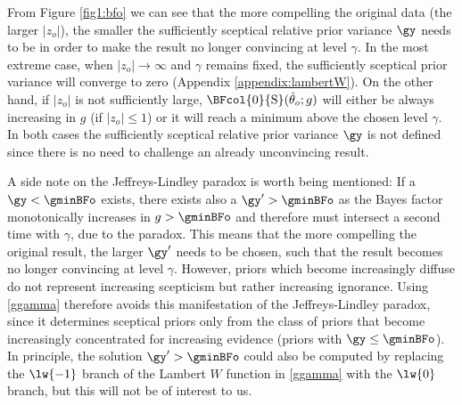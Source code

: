 From Figure \ref{fig1:bfo} we can see that the more compelling the original data
(\ie the larger $|z_o|$), the smaller the sufficiently sceptical relative prior
variance $\gy$ needs to be in order to make the result no longer convincing at
level $\gamma$. In the most extreme case, when $|z_{o}| \to \infty$ and $\gamma$
remains fixed, the sufficiently sceptical prior variance will converge to
zero (Appendix \ref{appendix:lambertW}). On the other hand, if $|z_o|$ is not
sufficiently large, $\BFcol{0}{\mathrm{S}}(\hat{\theta}_o; g)$ will either be
always increasing in $g$ (if $|z_o| \leq 1$) or it will reach a minimum above
the chosen level $\gamma$. In both cases the sufficiently sceptical relative
prior variance $\gy$ is not defined since there is no need to challenge an
already unconvincing result.

A side note on the Jeffreys-Lindley paradox is worth being mentioned: If a
$\gy < \gminBFo$ exists, there exists also a $\gy^\prime > \gminBFo$ as the
Bayes factor monotonically increases in $g > \gminBFo$ and therefore must
intersect a second time with $\gamma$, due to the paradox. This means that the
more compelling the original result, the larger $\gy^\prime$ needs to be chosen,
such that the result becomes no longer convincing at level $\gamma$. However,
priors which become increasingly diffuse do not represent increasing scepticism
but rather increasing ignorance. Using \eqref{ggamma} therefore avoids this
manifestation of the Jeffreys-Lindley paradox, since it determines sceptical
priors only from the class of priors that become increasingly concentrated for
increasing evidence (\ie priors with $\gy \leq \gminBFo$). In principle, the
solution $\gy^\prime > \gminBFo $ could also be computed by replacing the
$\lw{-1}$ branch of the Lambert $W$ function in \eqref{ggamma} with the $\lw{0}$
branch, but this will not be of interest to us.



